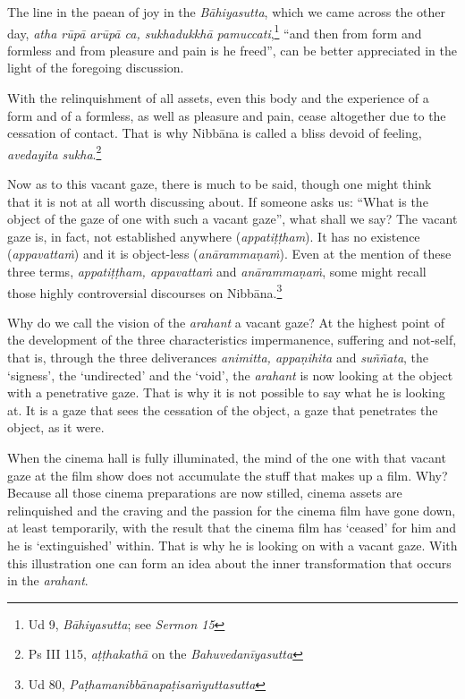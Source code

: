 The line in the paean of joy in the \emph{Bāhiyasutta}, which we came across the other day, \emph{atha rūpā arūpā ca, sukhadukkhā pamuccati},\footnote{Ud 9, \emph{Bāhiyasutta}; see \emph{Sermon 15}} ``and then from form and formless and from pleasure and pain is he freed'', can be better appreciated in the light of the foregoing discussion.

With the relinquishment of all assets, even this body and the experience of a form and of a formless, as well as pleasure and pain, cease altogether due to the cessation of contact. That is why Nibbāna is called a bliss devoid of feeling, \emph{avedayita sukha}.\footnote{Ps III 115, \emph{aṭṭhakathā} on the \emph{Bahuvedanīyasutta}}

Now as to this vacant gaze, there is much to be said, though one might think that it is not at all worth discussing about. If someone asks us: ``What is the object of the gaze of one with such a vacant gaze'', what shall we say? The vacant gaze is, in fact, not established anywhere (\emph{appatiṭṭham}). It has no existence (\emph{appavattaṁ}) and it is object-less (\emph{anārammaṇaṁ}). Even at the mention of these three terms, \emph{appatiṭṭham, appavattaṁ} and \emph{anārammaṇaṁ}, some might recall those highly controversial discourses on Nibbāna.\footnote{Ud 80, \emph{Paṭhamanibbānapaṭisaṁyuttasutta}}

Why do we call the vision of the \emph{arahant} a vacant gaze? At the highest point of the development of the three characteristics impermanence, suffering and not-self, that is, through the three deliverances \emph{animitta, appaṇihita} and \emph{suññata}, the `signess', the `undirected' and the `void', the \emph{arahant} is now looking at the object with a penetrative gaze. That is why it is not possible to say what he is looking at. It is a gaze that sees the cessation of the object, a gaze that penetrates the object, as it were.

When the cinema hall is fully illuminated, the mind of the one with that vacant gaze at the film show does not accumulate the stuff that makes up a film. Why? Because all those cinema preparations are now stilled, cinema assets are relinquished and the craving and the passion for the cinema film have gone down, at least temporarily, with the result that the cinema film has `ceased' for him and he is `extinguished' within. That is why he is looking on with a vacant gaze. With this illustration one can form an idea about the inner transformation that occurs in the \emph{arahant}.

